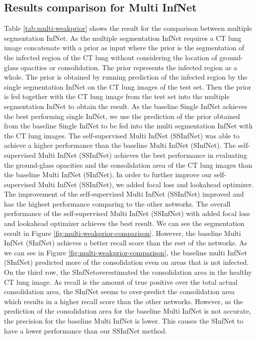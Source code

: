 \subsection{Results comparison for Multi InfNet}
Table \ref{tab:multi-weakprior} shows the result for the comparison between multiple segmentation InfNet. As the multiple segmentation InfNet requires a CT lung image concatenate with a prior as input where the prior is the segmentation of the infected region of the CT lung without considering the location of ground-glass opacities or consolidation. The prior represents the infected region as a whole. The prior is obtained by running prediction of the infected region by the single segmentation InfNet on the CT lung images of the test set. Then the prior is fed together with the CT lung image from the test set into the multiple segmentation InfNet to obtain the result. As the baseline Single InfNet achieves the best performing single InfNet, we use the prediction of the prior obtained from the baseline Single InfNet to be fed into the multi segmentation InfNet with the CT lung images. The self-supervised Multi InfNet (SSInfNet) was able to achieve a higher performance than the baseline Multi InfNet (SInfNet). The self-supervised Multi InfNet (SSInfNet) achieves the best performance in evaluating the ground-glass opacities and the consolidation area of the CT lung images than the baseline Multi InfNet (SInfNet). In order to further improve our self-supervised Multi InfNet (SSInfNet), we added focal loss and lookahead optimizer. The improvement of the self-supervised Multi InfNet (SSInfNet) improved and has the highest performance comparing to the other networks. The overall performance of the self-supervised Multi InfNet (SSInfNet) with added focal loss and lookahead optimizer achieves the best result. We can see the segmentation result in Figure \ref{fig:multi-weakprior-comparison}. However, the baseline Multi InfNet (SInfNet) achieves a better recall score than the rest of the networks. As we can see in Figure \ref{fig:multi-weakprior-comparison}, the baseline multi InfNet (SInfNet) predicted more of the consolidation even on areas that is not infected. On the third row, the SInfNetoverestimated the consolidation area in the healthy CT lung image. As recall is the amount of true positive over the total actual consolidation area, the SInfNet seems to over-predict the consolidation area which results in a higher recall score than the other networks. However, as the prediction of the consolidation area for the baseline Multi InfNet is not accurate, the precision for the baseline Multi InfNet is lower. This causes the SInfNet to have a lower performance than our SSInfNet method.
 
